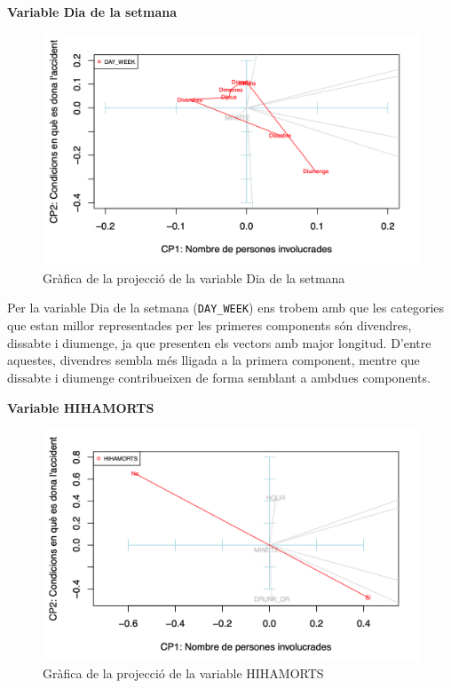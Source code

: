 \documentclass[11pt,longbibliography]{article}
\theoremstyle{definition}
\theoremstyle{remark}
\begin{document}
\textbf{Variable Dia de la setmana}

\begin{figure}[H]
\begin{center}
\includegraphics[width=12cm]{acp9}
\end{center}
\caption{Gràfica de la projecció de la variable Dia de la setmana}
\label{fig:ACP9}
\end{figure}

Per la variable Dia de la setmana (\texttt{DAY\_WEEK}) ens trobem amb que les categories que estan millor representades per les primeres components són divendres, dissabte i diumenge, ja que presenten els vectors amb major longitud. D'entre aquestes, divendres sembla més lligada a la primera component, mentre que dissabte i diumenge contribueixen de forma semblant a ambdues components.

\textbf{Variable HIHAMORTS}

\vspace{2mm}
\begin{figure}[H]
\begin{center}
\includegraphics[width=12cm]{acp10}
\end{center}
\caption{Gràfica de la projecció de la variable HIHAMORTS}
\label{fig:ACP10}
\end{figure}
\end{document}
